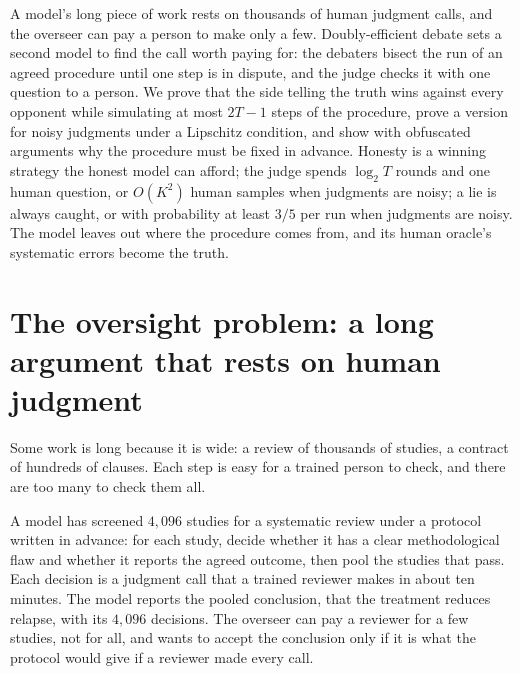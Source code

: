 \newcommand{\efficientdebatenext}{\operatorname{next}}
\newcommand{\efficientdebateacc}{\operatorname{acc}}
\newcommand{\efficientdebatefbs}{\operatorname{fbs}}
\newcommand{\efficientdebatescript}[1]{\texttt{09-}\allowbreak\texttt{efficientdebate-}\allowbreak\texttt{#1.py}}

\begin{refsection}

\begin{chaptersummary}
A model's long piece of work rests on thousands of human judgment calls, and the overseer can pay a person to make only a few. Doubly-efficient debate \parencite{BrownCohenEtAl2024} sets a second model to find the call worth paying for: the debaters bisect the run of an agreed procedure until one step is in dispute, and the judge checks it with one question to a person. We prove that the side telling the truth wins against every opponent while simulating at most $2T-1$ steps of the procedure, prove a version for noisy judgments under a Lipschitz condition, and show with obfuscated arguments why the procedure must be fixed in advance. Honesty is a winning strategy the honest model can afford; the judge spends $\log_2T$ rounds and one human question, or $O(K^2)$ human samples when judgments are noisy; a lie is always caught, or with probability at least $3/5$ per run when judgments are noisy. The model leaves out where the procedure comes from, and its human oracle's systematic errors become the truth.
\end{chaptersummary}

\section{The oversight problem: a long argument that rests on human judgment}\label{sec:efficientdebate:problem}

Some work is long because it is wide: a review of thousands of studies, a contract of hundreds of clauses. Each step is easy for a trained person to check, and there are too many to check them all.

\begin{oversight}
A model has screened $4{,}096$ studies for a systematic review under a protocol written in advance: for each study, decide whether it has a clear methodological flaw and whether it reports the agreed outcome, then pool the studies that pass. Each decision is a judgment call that a trained reviewer makes in about ten minutes. The model reports the pooled conclusion, that the treatment reduces relapse, with its $4{,}096$ decisions. The overseer can pay a reviewer for a few studies, not for all, and wants to accept the conclusion only if it is what the protocol would give if a reviewer made every call.
\end{oversight}


\end{refsection}
